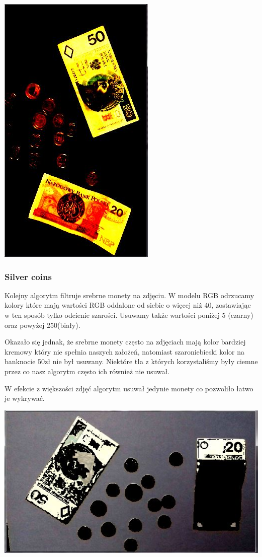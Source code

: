 \documentclass[12pt]{article}
\begin{document}
\includegraphics[scale=0.4]{BrightBad}

\newpage
\subsubsection*{Silver coins}
Kolejny algorytm filtruje srebrne monety na zdjęciu.
W modelu RGB odrzucamy kolory które mają wartości RGB oddalone od siebie o więcej niż 40, zostawiając w ten sposób tylko odcienie szarości. Usuwamy także wartości poniżej 5 (czarny) oraz powyżej 250(biały).

Okazało się jednak, że srebrne monety często na zdjęciach mają kolor bardziej kremowy który nie spełnia naszych założeń, natomiast szaroniebieski kolor na banknocie 50zł nie był usuwany. Niektóre tła z których korzystaliśmy były ciemne przez co nasz algorytm często ich również nie usuwał.

W efekcie z większości zdjęć algorytm usuwał jedynie monety co pozwoliło łatwo je wykrywać.

\includegraphics[scale=0.4]{RemoveSilver}
\end{document}
